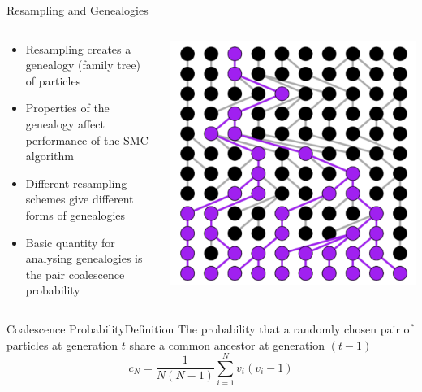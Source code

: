 \documentclass[aspectratio=169]{beamer}
\theoremstyle{definition}
\newcommand{\vt}[1]{v_{#1}}
\begin{document}
\begin{frame}{Resampling and Genealogies}
\begin{columns}
\begin{column}{0.45\textwidth}
\begin{itemize}
\item Resampling creates a genealogy (family tree) of particles
\item Properties of the genealogy affect performance of the SMC algorithm
\item Different resampling schemes give different forms of genealogies
\item Basic quantity for analysing genealogies is the pair coalescence probability
\end{itemize}
\end{column}
\begin{column}{0.45\textwidth}
\includegraphics[width=\textwidth]{eg_WF.pdf}
\end{column}
\end{columns}
\end{frame}


\begin{frame}{Coalescence Probability}{Definition}
The probability that a randomly chosen pair of particles at generation $t$ share a common ancestor at generation $(t-1)$
\begin{equation*}
c_N = \frac{1}{N(N-1)} \sum_{i=1}^N \vt{i}(\vt{i}-1)
\end{equation*}

\end{frame}
\end{document}
